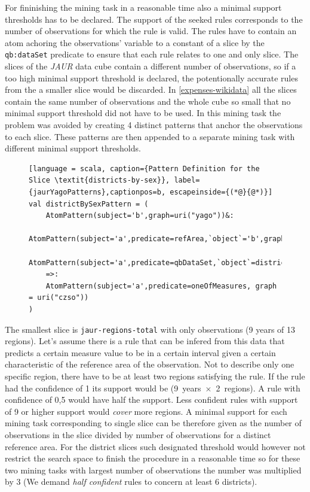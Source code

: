 For fininishing the mining task in a reasonable time also a minimal support thresholds has to be declared. The support of the seeked rules corresponds to the number of observations for which the rule is valid. The rules have to contain an atom achoring the observations' variable to a constant of a slice by the \verb|qb:dataSet| predicate to ensure that each rule relates to one and only slice. The slices of the \textit{JAUR} data cube contain a different number of observations, so if a too high minimal support threshold is declared, the potentionally accurate rules from the a smaller slice would be discarded. In \ref{expenses-wikidata} all the slices contain the same number of observations and the whole cube so small that no minimal support threshold did not have to be used. In this mining task the problem was avoided by creating 4 distinct patterns that anchor the observations to each slice. These patterns are then appended to a separate mining task with different minimal support thresholds.

\begin{figure}[h]
\begin{lstlisting}[language = scala, caption={Pattern Definition for the Slice \textit{districts-by-sex}}, label={jaurYagoPatterns},captionpos=b, escapeinside={(*@}{@*)}]
val districtBySexPattern = (
    AtomPattern(subject='b',graph=uri("yago"))&:
    AtomPattern(subject='a',predicate=refArea,`object`='b',graph=uri("czso"))&:
    AtomPattern(subject='a',predicate=qbDataSet,`object`=districtBySexSlice,graph=uri("czso"))
    =>: 
    AtomPattern(subject='a',predicate=oneOfMeasures, graph = uri("czso"))
)
\end{lstlisting}
\end{figure}

The smallest slice is \verb|jaur-regions-total| with only  observations (9 years of 13 regions). Let's assume there is a rule that can be infered from this data that predicts a certain measure value to be in a certain interval given a certain characteristic of the reference area of the observation. Not to describe only one specific region, there have to be at least two regions satisfying the rule. If the rule had the confidence of 1 its support would be  (9~years~$\times$~2~regions). A rule with confidence of 0,5 would have half the support. Less confident rules with support of 9 or higher support would \textit{cover} more regions. A minimal support for each mining task corresponding to single slice can be therefore given as the number of observations in the slice divided by number of observations for a distinct reference area. For the district slices such designated threshold would however not restrict the search space to finish the procedure in a reasonable time so for these two mining tasks with largest number of observations the number was multiplied by 3 (We demand \textit{half confident} rules to concern at least 6 districts).

